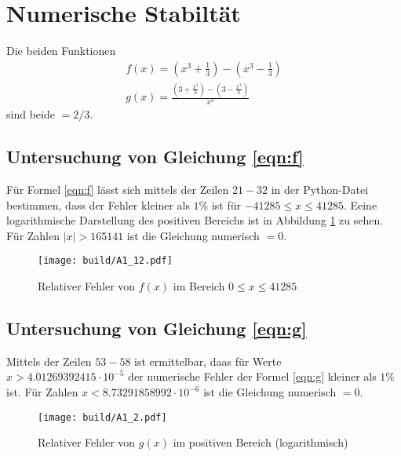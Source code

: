



\section{Numerische Stabiltät}
Die beiden Funktionen
\begin{gather}
  f(x)=\left(x^3+\frac{1}{3}\right)-\left(x^3-\frac{1}{3}\right)\label{eqn:f}\\
  g(x)=\frac{\left(3+\frac{x^3}{3}\right)-\left(3-\frac{x^3}{3}\right)}{x^3}\label{eqn:g}
\end{gather}
sind beide $=2/3$.

\subsection{Untersuchung von Gleichung \eqref{eqn:f}}
\noindent Für Formel \eqref{eqn:f} lässt sich mittels der Zeilen $21-32$ in der Python-Datei bestimmen, dass der Fehler kleiner als $1\%$ ist für $-41285 \leq x \leq 41285$. Eeine logarithmische Darstellung des positiven Bereichs ist in Abbildung \ref{fig:FehlerFlog} zu sehen.\\
Für Zahlen $|x|>165141$ ist die Gleichung numerisch $=0$.


\begin{figure}
  \centering
  \texttt{[image: build/A1\_12.pdf]}
  \caption{Relativer Fehler von $f(x)$ im Bereich $0 \leq x \leq 41285$}
  \label{fig:FehlerFlog}
\end{figure}

\newpage

\subsection{Untersuchung von Gleichung \eqref{eqn:g}}
\noindent Mittels der Zeilen $53-58$ ist ermittelbar, daas für Werte $x>4.01269392415 \cdot 10^{-5}$ der numerische Fehler der Formel \eqref{eqn:g} kleiner als $1\%$ ist.
Für Zahlen $x<8.73291858992 \cdot 10^{-6}$ ist die Gleichung numerisch $=0$.

\begin{figure}
  \centering
  \texttt{[image: build/A1\_2.pdf]}
  \caption{Relativer Fehler von $g(x)$ im positiven Bereich (logarithmisch)}
  \label{fig:FehlerGlog}
\end{figure}

